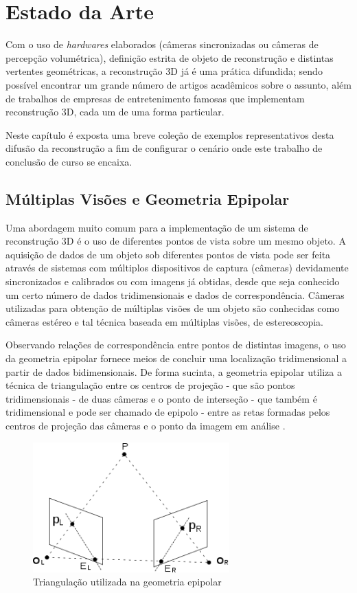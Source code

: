 \chapter{Estado da Arte}
	\label{capituloEstadoDaArte}

	Com o uso de \textit{hardwares} elaborados (câmeras sincronizadas ou câmeras de percepção volumétrica), definição estrita de objeto de reconstrução e distintas vertentes geométricas, a reconstrução 3D já é uma prática difundida; sendo possível encontrar um grande número de artigos acadêmicos sobre o assunto, além de trabalhos de empresas de entretenimento famosas que implementam reconstrução 3D, cada um de uma forma particular.

	Neste capítulo é exposta uma breve coleção de exemplos representativos desta difusão da reconstrução a fim de configurar o cenário onde este trabalho de conclusão de curso se encaixa.
	
	\section{Múltiplas Visões e Geometria Epipolar}
	
	Uma abordagem muito comum para a implementação de um sistema de reconstrução 3D é o uso de diferentes pontos de vista sobre um mesmo objeto. A aquisição de dados de um objeto sob diferentes pontos de vista pode ser feita através de sistemas com múltiplos dispositivos de captura (câmeras) devidamente sincronizados e calibrados ou com imagens já obtidas, desde que seja conhecido um certo número de dados tridimensionais e dados de correspondência. Câmeras utilizadas para obtenção de múltiplas visões de um objeto são conhecidas como câmeras estéreo e tal técnica baseada em múltiplas visões, de estereoscopia.
	
	Observando relações de correspondência entre pontos de distintas imagens, o uso da geometria epipolar fornece meios de concluir uma localização tridimensional a partir de dados bidimensionais. De forma sucinta, a geometria epipolar utiliza a técnica de triangulação entre os centros de projeção - que são pontos tridimensionais - de duas câmeras e o ponto de interseção - que também é tridimensional e pode ser chamado de epipolo - entre as retas formadas pelos centros de projeção das câmeras e o ponto da imagem em análise \cite{animation}.
	
	\begin{figure}[!htb]
		\centering
		\includegraphics[height=5cm]{imagens/geometriaEpipolar.png}
		\caption{Triangulação utilizada na geometria epipolar}
		\label{fotoGeometriaEpipolar}
	\end{figure}
	
